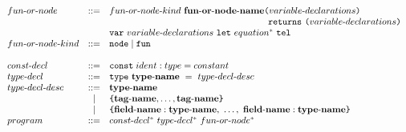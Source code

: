 \documentclass[a4paper]{article}
\newcommand{\p}[0]{\; \vert \;}
\newcommand{\Coloneqq}[0]{::=}
\begin{document}
\[\begin{array}{lcl}
  \\

  \funo{} & \Coloneqq & \funo{}\sdash{}kind \ 
  {\bf \funo{}\sdash{}name}\lp{}variable\sdash{}declarations\rp{} \ \\
  & & \hspace{6.1cm}
    \mathtt{returns} \ \lp{}variable\sdash{}declarations\rp{} \\
  & & \mathtt{var} \ variable\sdash{}declarations \ \mathtt{let} \ equation^*
  \ \mathtt{tel} \\
  \funo{}\sdash{}kind & \Coloneqq & \mathtt{node} \p \mathtt{fun} \\

  \\

  const\sdash{}decl & \Coloneqq & \mathtt{const} \; ident : type = constant \\
  type\sdash{}decl & \Coloneqq & \mathtt{type} \ {\bf type\sdash{}name} \ = \ 
    type\sdash{}decl\sdash{}desc \\
  type\sdash{}decl\sdash{}desc & \Coloneqq & {\bf type\sdash{}name} \\
  & | & \lcb{} {\bf tag\sdash{}name}, \dots, {\bf tag\sdash{}name} \rcb{} \\
  & | & \lcb{} {\bf field\sdash{}name} : {\bf type\sdash{}name},\  \dots,\ 
    {\bf field\sdash{}name} : {\bf type\sdash{}name} \rcb{} \\
  program & \Coloneqq &
    const\sdash{}decl^* \  type\sdash{}decl^* \  \funo{}^*
\end{array}
\]
\end{document}
